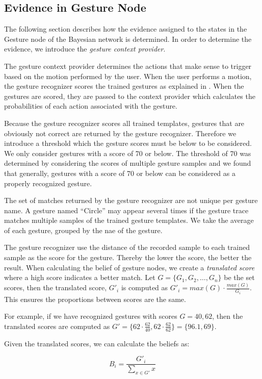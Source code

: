 \subsection{Evidence in Gesture Node}
\label{sec:design:bayesian-network:gesture-node-evidence}

The following section describes how the evidence assigned to the states in the Gesture node of the Bayesian network is determined. In order to determine the evidence, we introduce the \emph{gesture context provider}.

The gesture context provider determines the actions that make sense to trigger based on the motion performed by the user. When the user performs a motion, the gesture recognizer scores the trained gestures as explained in . When the gestures are scored, they are passed to the context provider which calculates the probabilities of each action associated with the gesture. 

Because the gesture recognizer scores all trained templates, gestures that are obviously not correct are returned by the gesture recognizer. Therefore we introduce a threshold which the gesture scores must be below to be considered. We only consider gestures with a score of 70 or below. The threshold of 70 was determined by considering the scores of multiple gesture samples and we found that generally, gestures with a score of 70 or below can be considered as a properly recognized gesture.

The set of matches returned by the gesture recognizer are not unique per gesture name. A gesture named ``Circle'' may appear several times if the gesture trace matches multiple samples of the trained gesture templates. We take the average of each gesture, grouped by the nae of the gesture.

The gesture recognizer use the distance of the recorded sample to each trained sample as the score for the gesture. Thereby the lower the score, the better the result. When calculating the belief of gesture nodes, we create a \emph{translated score} where a high score indicates a better match. Let $G = \{G_1, G_2, \ldots, G_n\}$ be the set scores, then the translated score, $G'_i$ is computed as $G'_i = max(G) \cdot \frac{max(G)}{G_i}$. This ensures the proportions between scores are the same.

For example, if we have recognized gestures with scores $G = {40, 62}$, then the translated scores are computed as $G' = \{ 62 \cdot \frac{62}{40}, 62 \cdot \frac{62}{62} \} = \{ 96.1, 69 \}$.

Given the translated scores, we can calculate the beliefs as:

\begin{equation*}
B_i = \frac{{G'}_{i}}{\sum\limits_{x \in G'} x}
\end{equation*}

